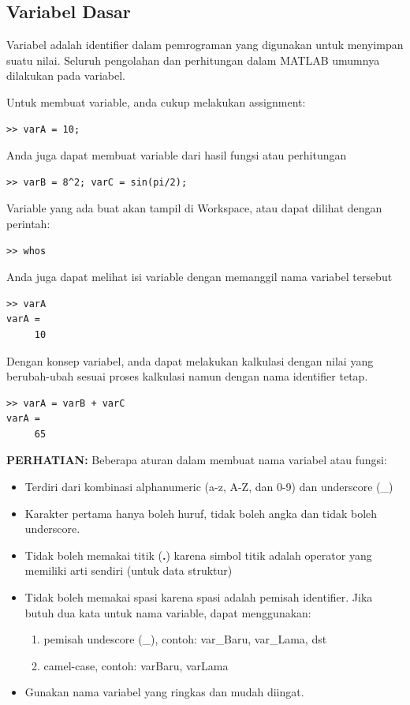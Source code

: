 \documentclass[12pt]{book}
\begin{document}
	\subsection{Variabel Dasar}

	Variabel adalah identifier dalam pemrograman yang digunakan untuk menyimpan suatu nilai.
	Seluruh pengolahan dan perhitungan dalam MATLAB umumnya dilakukan pada variabel.

	Untuk membuat variable, anda cukup melakukan assignment:
	\begin{verbatim}
>> varA = 10;
	\end{verbatim}

	Anda juga dapat membuat variable dari hasil fungsi atau perhitungan
	\begin{verbatim}
>> varB = 8^2; varC = sin(pi/2);
	\end{verbatim}

	Variable yang ada buat akan tampil di Workspace, atau dapat dilihat dengan perintah:
	\begin{verbatim}
>> whos
	\end{verbatim}

	\newpage
	Anda juga dapat melihat isi variable dengan memanggil nama variabel tersebut
	\begin{verbatim}
>> varA
varA =
     10
	\end{verbatim}

	Dengan konsep variabel, anda dapat melakukan kalkulasi dengan nilai yang berubah-ubah sesuai proses kalkulasi namun dengan nama identifier tetap.
	\begin{verbatim}
>> varA = varB + varC
varA =
     65
	\end{verbatim}

	\textbf{PERHATIAN:} Beberapa aturan dalam membuat nama variabel atau fungsi:
	\begin{itemize}
		\item Terdiri dari kombinasi alphanumeric (a-z, A-Z, dan 0-9) dan underscore (\_)
		\item Karakter pertama hanya boleh huruf, tidak boleh angka dan tidak boleh underscore.
		\item Tidak boleh memakai titik (\textbf{.}) karena simbol titik adalah operator yang memiliki arti sendiri (untuk data struktur)
		\item Tidak boleh memakai spasi karena spasi adalah pemisah identifier.
		Jika butuh dua kata untuk nama variable, dapat menggunakan:
		\begin{enumerate}
			\item pemisah undescore (\_), contoh: var\_Baru, var\_Lama, dst
			\item camel-case, contoh: varBaru, varLama
		\end{enumerate}
		\item Gunakan nama variabel yang ringkas dan mudah diingat.
	\end{itemize}
\end{document}
